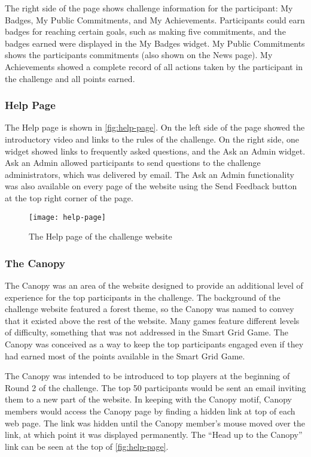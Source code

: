 The right side of the page shows challenge information for the participant: My Badges, My Public Commitments, and My Achievements. Participants could earn badges for reaching certain goals, such as making five commitments, and the badges earned were displayed in the My Badges widget. My Public Commitments shows the participants commitments (also shown on the News page). My Achievements showed a complete record of all actions taken by the participant in the challenge and all points earned.


\subsubsection{Help Page}

The Help page is shown in \autoref{fig:help-page}. On the left side of the page showed the introductory video and links to the rules of the challenge. On the right side, one widget showed links to frequently asked questions, and the Ask an Admin widget. Ask an Admin allowed participants to send questions to the challenge administrators, which was delivered by email. The Ask an Admin functionality was also available on every page of the website using the Send Feedback button at the top right corner of the page.

\begin{figure}[htbp]
	\centering
		\texttt{[image: help-page]}
		\caption{The Help page of the challenge website}
\label{fig:help-page}
\end{figure}


\subsubsection{The Canopy}

The Canopy was an area of the website designed to provide an additional level of experience for the top participants in the challenge. The background of the challenge website featured a forest theme, so the Canopy was named to convey that it existed above the rest of the website. Many games feature different levels of difficulty, something that was not addressed in the Smart Grid Game. The Canopy was conceived as a way to keep the top participants engaged even if they had earned most of the points available in the Smart Grid Game.

The Canopy was intended to be introduced to top players at the beginning of Round 2 of the challenge. The top 50 participants would be sent an email inviting them to a new part of the website. In keeping with the Canopy motif, Canopy members would access the Canopy page by finding a hidden link at top of each web page. The link was hidden until the Canopy member's mouse moved over the link, at which point it was displayed permanently. The ``Head up to the Canopy'' link can be seen at the top of \autoref{fig:help-page}.

